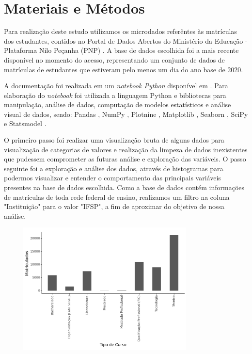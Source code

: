 \documentclass[conference]{IEEEtran}
\begin{document}
\section{Materiais e Métodos}
Para realização deste estudo utilizamos os microdados referêntes às matrículas dos estudantes, contidos no Portal de Dados Abertos do Ministério da Educação - Plataforma Nilo Peçanha (PNP) \cite{pnpdados2024}. A base de dados escolhida \cite{microdados2021} foi a mais recente disponível no momento do acesso, representando um conjunto de dados de matrículas de estudantes que estiveram pelo menos um dia do ano base de 2020.\par
A documentação foi realizada em um \textit{notebook Python} disponível em \cite{notebook}. Para elaboração do \textit{notebook} foi utilizada a linguagem Python \cite{python2024} e bibliotecas para manipulação, análise de dados, computação de modelos estatísticos e análise visual de dados, sendo: Pandas \cite{pandas2024}, NumPy \cite{numpy2024}, Plotnine \cite{plotnine2024}, Matplotlib \cite{matplot2024}, Seaborn \cite{seaborn2024}, SciPy \cite{scipy2024} e Statsmodel \cite{statsmodel2024}.\par
O primeiro passo foi realizar uma visualização bruta de alguns dados para visualização de categorias de valores e realização da limpeza de dados inexistentes que pudessem comprometer as futuras análise e exploração das variáveis. O passo seguinte foi a exploração e análise dos dados, através de histogramas para podermos visualizar e entender o comportamento das principais variáveis presentes na base de dados escolhida. Como a base de dados contém informações de matrículas de toda rede federal de ensino, realizamos um filtro na coluna "Instituição" para o valor "IFSP", a fim de aproximar do objetivo de nossa análise.\par

\begin{figure}[h]
    \includegraphics[width=8.9cm]{figs/histograma-tipos-cursos.png}
    \centering
\end{figure}
\end{document}
